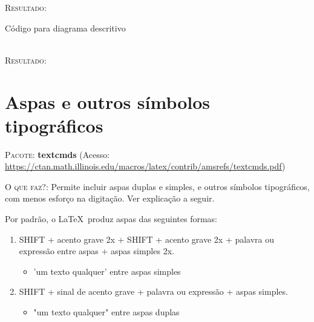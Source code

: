 \documentclass[a4paper,12pt,oneside,openright,extrafontsizes,openbib]{memoir}
\begin{document}
{\textsc{Resultado}:

\begin{center}
\end{center}

\begin{codex}{Código para diagrama descritivo}
\end{codex}
\ \\

\textsc{Resultado:}

\begin{center}
\end{center}


\chapter{Aspas e outros símbolos tipográficos}

\textsc{Pacote:} \textbf{textcmds} (Acesso: \url{https://ctan.math.illinois.edu/macros/latex/contrib/amsrefs/textcmds.pdf})

\textsc{O que faz?}: Permite incluir aspas duplas e simples, e outros símbolos tipográficos, com menos esforço na digitação. Ver explicação a seguir.

Por padrão, o \LaTeX\ produz aspas das seguintes formas:

\begin{enumerate}
	\item SHIFT + acento grave 2x + SHIFT + acento grave 2x + palavra ou expressão entre aspas + aspas simples 2x.
	\begin{itemize}
		\item 'um texto qualquer' entre aspas simples
	\end{itemize}
	\item SHIFT + sinal de acento grave + palavra ou expressão + aspas simples.
	\begin{itemize}
		\item "um texto qualquer" entre aspas duplas
	\end{itemize}
\end{enumerate}

}
\end{document}

